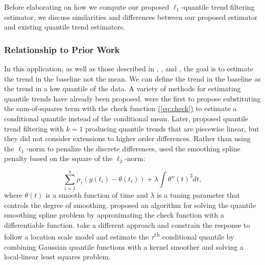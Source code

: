\documentclass[aoas]{imsart}
\newcommand{\Eqn}[1]{\hyperref[eq:#1]{{\rm (\ref*{eq:#1})}}} %
\newcommand{\Eqn}[1]{{(\ref{eq:#1})}} %
\begin{document}
Before elaborating on how we compute our proposed $\ell_1$-quantile trend filtering estimator, we discuss similarities and differences between our proposed estimator and existing quantile trend estimators.

\subsubsection{Relationship to Prior Work}

In this application, as well as those described in \cite{Ning2014}, \cite{marandi2015qualitative}, and \cite{pettersson2013algorithm}, the goal is to estimate the trend in the baseline not the mean. We can define the trend in the baseline as the trend in a low quantile of the data. A variety of methods for estimating quantile trends have already been proposed. \cite{Koenker1978} were the first to propose substituting the sum-of-squares term with the check function  \Eqn{check} to estimate a conditional quantile instead of the conditional mean. Later, \cite{KoenkerNgPortnoy1994} proposed quantile trend filtering with $k = 1$ producing quantile trends that are piecewise linear, but they did not consider extensions to higher order differences. Rather than using the $\ell_1$-norm to penalize the discrete differences, \cite{nychka1995nonparametric} used the smoothing spline penalty based on the square of the $\ell_2$-norm:

\begin{equation*}
\label{eq:smoothingspline}
\sum_{i=1}^n\rho_{\tau}(y(t_i) - \theta(t_i)) + \lambda\int \theta''(t)^2 dt,
\end{equation*}
where $\theta(t)$ is a smooth function of time and $\lambda$ is a tuning parameter that controls the degree of smoothing. \cite{Oh2011} proposed an algorithm for solving the quantile smoothing spline problem by approximating the check function with a differentiable function. \cite{Racine2017} take a different approach and constrain the response to follow a location scale model and estimate the $\tau$\textsuperscript{th} conditional quantile by combining Gaussian quantile functions with a kernel smoother and solving a local-linear least squares problem. 


\end{document}
